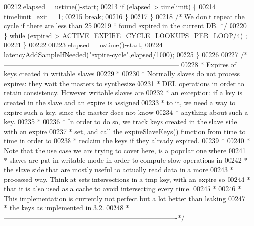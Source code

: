 \begin{DoxyCode}
{{{{00212                 elapsed = ustime()-start;
00213                 \textcolor{keywordflow}{if} (elapsed > timelimit) \{
00214                     timelimit\_exit = 1;
00215                     \textcolor{keywordflow}{break};
00216                 \}
00217             \}
00218             \textcolor{comment}{/* We don't repeat the cycle if there are less than 25%
00219 \textcolor{comment}{             * found expired in the current DB. */}
00220         \} \textcolor{keywordflow}{while} (expired > \hyperlink{server_8h_a85d8b4e82684730649464046a4a00be2}{ACTIVE\_EXPIRE\_CYCLE\_LOOKUPS\_PER\_LOOP}/4)
      ;
00221     \}
00222 
00223     elapsed = ustime()-start;
00224     \hyperlink{latency_8h_a77922ab34035890c90f98831a9071359}{latencyAddSampleIfNeeded}(\textcolor{stringliteral}{"expire-cycle"},elapsed/1000);
00225 \}
00226 
00227 \textcolor{comment}{/*-----------------------------------------------------------------------------}
00228 \textcolor{comment}{ * Expires of keys created in writable slaves}
00229 \textcolor{comment}{ *}
00230 \textcolor{comment}{ * Normally slaves do not process expires: they wait the masters to synthesize}
00231 \textcolor{comment}{ * DEL operations in order to retain consistency. However writable slaves are}
00232 \textcolor{comment}{ * an exception: if a key is created in the slave and an expire is assigned}
00233 \textcolor{comment}{ * to it, we need a way to expire such a key, since the master does not know}
00234 \textcolor{comment}{ * anything about such a key.}
00235 \textcolor{comment}{ *}
00236 \textcolor{comment}{ * In order to do so, we track keys created in the slave side with an expire}
00237 \textcolor{comment}{ * set, and call the expireSlaveKeys() function from time to time in order to}
00238 \textcolor{comment}{ * reclaim the keys if they already expired.}
00239 \textcolor{comment}{ *}
00240 \textcolor{comment}{ * Note that the use case we are trying to cover here, is a popular one where}
00241 \textcolor{comment}{ * slaves are put in writable mode in order to compute slow operations in}
00242 \textcolor{comment}{ * the slave side that are mostly useful to actually read data in a more}
00243 \textcolor{comment}{ * processed way. Think at sets intersections in a tmp key, with an expire so}
00244 \textcolor{comment}{ * that it is also used as a cache to avoid intersecting every time.}
00245 \textcolor{comment}{ *}
00246 \textcolor{comment}{ * This implementation is currently not perfect but a lot better than leaking}
00247 \textcolor{comment}{ * the keys as implemented in 3.2.}
00248 \textcolor{comment}{ *----------------------------------------------------------------------------*/}
}}}}}
\end{DoxyCode}
